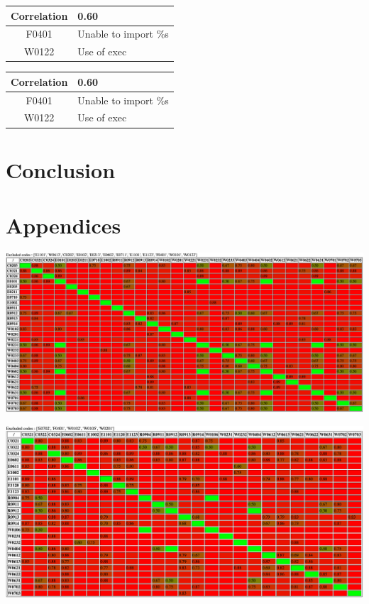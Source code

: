 \documentclass[12pt, a4paper]{article}
\newcommand{\tbf}[1]{\textbf{#1}}
\newcommand{\noi}{\noindent}
\begin{document}
\bigskip \noi
\begin{tabularx}{\textwidth}{|c|X|}
\hline
\tbf{Correlation}   & 0.60 \\
\hline
F0401   &  Unable to import \%s \\
\hline
W0122   &  Use of exec \\
\hline
\end{tabularx}

\bigskip \noi
\begin{tabularx}{\textwidth}{|c|X|}
\hline
\tbf{Correlation}   & 0.60 \\
\hline
F0401   &  Unable to import \%s \\
\hline
W0122   &  Use of exec \\
\hline
\end{tabularx}

\section{Conclusion}




\newpage
\section*{Appendices}

\renewcommand{\textfraction}{0.01}
\renewcommand{\topfraction}{0.01}
\renewcommand{\bottomfraction}{0.01}
\renewcommand{\floatpagefraction}{0.01}
\setcounter{totalnumber}{1}

\includegraphics[angle=90,origin=c,totalheight=0.99\textheight]{cap1}

\includegraphics[angle=90,origin=c,totalheight=\textheight]{cap2}
\end{document}
